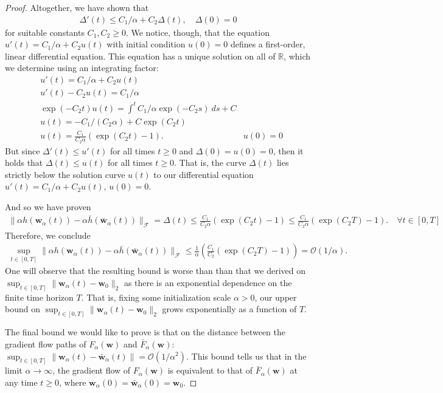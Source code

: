 \documentclass{article}
\begin{document}
\begin{proof}
Altogether, we have shown that
\begin{align*}
    \Delta'(t) \leq C_1/\alpha + C_2\Delta(t), \quad \Delta(0) = 0
\end{align*}
for suitable constants $C_1, C_2 \geq 0$. We notice, though, that the equation $u'(t) = C_1/\alpha + C_2 u(t)$ with initial condition $u(0) = 0$ defines a first-order, linear differential equation. This equation has a unique solution on all of $\mathbb{R}$, which we determine using an integrating factor:
\begin{align*}
    &u'(t) = C_1/\alpha + C_2 u(t)\\
    &u'(t) - C_2u(t) = C_1/\alpha\\
    & \exp(-C_2t)u(t) = \int^t C_1/\alpha  \exp(-C_2s) \ ds + C\\
    & u(t) = -C_1/(C_2\alpha) + C\exp(C_2t)\\
    & u(t) = \frac{C_1}{C_2\alpha}(\exp(C_2t) - 1). & u(0) = 0
\end{align*}
But since $\Delta'(t) \leq u'(t)$ for all times $t \geq 0$ and $\Delta(0) = u(0) = 0$, then it holds that $\Delta(t) \leq u(t)$ for all times $t \geq 0$. That is, the curve $\Delta(t)$ lies strictly below the solution curve $u(t)$ to our differential equation $u'(t) = C_1/\alpha + C_2 u(t)$, $u(0) = 0$.

And so we have proven
\begin{align*}
    \| \alpha h(\boldsymbol{w}_{\alpha}(t)) - \alpha \bar{h}(\boldsymbol{\bar{w}}_{\alpha}(t)) \|_{\mathcal{F}} =  \Delta(t) \leq \frac{C_1}{C_2\alpha}(\exp(C_2t) - 1) \leq \frac{C_1}{C_2\alpha}(\exp(C_2T) - 1). \quad \forall t \in [0, T]
\end{align*}
Therefore, we conclude
\begin{align*}
   \sup_{t \in [0, T]} \| \alpha h(\boldsymbol{w}_{\alpha}(t)) - \alpha \bar{h}(\boldsymbol{\bar{w}}_{\alpha}(t)) \|_{\mathcal{F}} \leq \frac{1}{\alpha} \left( \frac{C_1}{C_2}(\exp(C_2T) - 1) \right) = \mathcal{O}(1/\alpha).
\end{align*}
One will observe that the resulting bound is worse than than that we derived on $\sup_{t \in [0, T]} \| \boldsymbol{w}_{\alpha}(t) - \boldsymbol{w}_0 \|_2$ as there is an exponential dependence on the finite time horizon $T$. That is, fixing some initialization scale $\alpha > 0$, our upper bound on $\sup_{t \in [0, T]} \| \boldsymbol{w}_{\alpha}(t) - \boldsymbol{w}_0 \|_2$ grows exponentially as a function of $T$.

The final bound we would like to prove is that on the distance between the gradient flow paths of $F_{\alpha}(\boldsymbol{w})$ and $\bar{F}_{\alpha}(\boldsymbol{w})$: $\sup_{t \in [0, T]} \| \boldsymbol{w}_{\alpha}(t) -  \boldsymbol{\bar{w}}_{\alpha}(t) \| = \mathcal{O}(1/\alpha^2)$. This bound tells us that in the limit $\alpha \rightarrow \infty$, the gradient flow of $F_{\alpha}(\boldsymbol{w})$ is equivalent to that of $\bar{F}_{\alpha}(\boldsymbol{w})$ at any time $t \geq 0$, where $\boldsymbol{w}_{\alpha}(0) = \boldsymbol{\bar{w}}_{\alpha}(0) = \boldsymbol{w}_0$. 


\end{proof}
\end{document}
